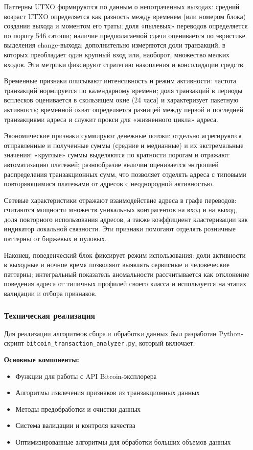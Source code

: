 Паттерны UTXO формируются по данным о непотраченных выходах: средний возраст UTXO определяется как разность между временем (или номером блока) создания выхода и моментом его траты; доля «пылевых» переводов определяется по порогу 546 сатоши; наличие предполагаемой сдачи оценивается по эвристике выделения change-выхода; дополнительно измеряются доли транзакций, в которых преобладает один крупный вход или, наоборот, множество мелких входов. Эти метрики фиксируют стратегию накопления и консолидации средств.

Временные признаки описывают интенсивность и режим активности: частота транзакций нормируется по календарному времени; доля транзакций в периоды всплесков оценивается в скользящем окне (24 часа) и характеризует пакетную активность; временной охват определяется разницей между первой и последней транзакциями адреса и служит прокси для «жизненного цикла» адреса.

Экономические признаки суммируют денежные потоки: отдельно агрегируются отправленные и полученные суммы (средние и медианные) и их экстремальные значения; «круглые» суммы выделяются по кратности порогам и отражают автоматизацию платежей; разнообразие величин оценивается энтропией распределения транзакционных сумм, что позволяет отделять адреса с типовыми повторяющимися платежами от адресов с неоднородной активностью.

Сетевые характеристики отражают взаимодействие адреса в графе переводов: считаются мощности множеств уникальных контрагентов на вход и на выход, доля повторного использования адресов, а также коэффициент кластеризации как индикатор локальной связности. Эти признаки помогают отделять розничные паттерны от биржевых и пуловых.

Наконец, поведенческий блок фиксирует режим использования: доли активности в выходные и ночное время позволяют выявлять сервисные и человеческие паттерны; интегральный показатель аномальности рассчитывается как отклонение поведения адреса от типичных профилей своего класса и используется на этапах валидации и отбора признаков.

\subsubsection{Техническая реализация}

Для реализации алгоритмов сбора и обработки данных был разработан Python-скрипт \texttt{bitcoin\_transaction\_analyzer.py}, который включает:

\textbf{Основные компоненты:}
\begin{itemize}
    \item Функции для работы с API Bitcoin-эксплорера
    \item Алгоритмы извлечения признаков из транзакционных данных
    \item Методы предобработки и очистки данных
    \item Система валидации и контроля качества
    \item Оптимизированные алгоритмы для обработки больших объемов данных
\end{itemize}


